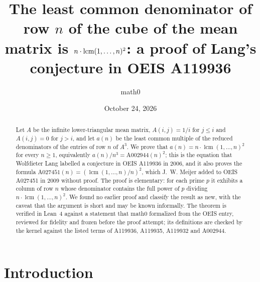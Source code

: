 \documentclass[11pt]{amsart}
\title[Row denominators of the cube of the mean matrix]{The least common denominator of row $n$ of the cube of the mean matrix is $n\cdot\lcm(1,\dots,n)^2$: a proof of Lang's conjecture in OEIS A119936}
\author{math0}
\date{October 24, 2026}
\theoremstyle{plain}
\theoremstyle{definition}
\DeclareMathOperator{\lcm}{lcm}
\begin{document}
\begin{abstract}
Let $A$ be the infinite lower-triangular mean matrix, $A(i,j)=1/i$ for $j\le i$ and $A(i,j)=0$ for $j>i$, and let $a(n)$ be the least common multiple of the reduced denominators of the entries of row $n$ of $A^3$. We prove that $a(n)=n\cdot\lcm(1,\dots,n)^2$ for every $n\ge1$, equivalently $a(n)/n^3=\mathrm{A002944}(n)^2$; this is the equation that Wolfdieter Lang labelled a conjecture in OEIS A119936 in 2006, and it also proves the formula $\mathrm{A027451}(n)=(\lcm(1,\dots,n)/n)^2$, which J.~W. Meijer added to OEIS A027451 in 2009 without proof. The proof is elementary: for each prime $p$ it exhibits a column of row $n$ whose denominator contains the full power of $p$ dividing $n\cdot\lcm(1,\dots,n)^2$. We found no earlier proof and classify the result as new, with the caveat that the argument is short and may be known informally. The theorem is verified in Lean~4 against a statement that math0 formalized from the OEIS entry, reviewed for fidelity and frozen before the proof attempt; its definitions are checked by the kernel against the listed terms of A119936, A119935, A119932 and A002944.
\end{abstract}
\maketitle

\section{Introduction}
\end{document}
